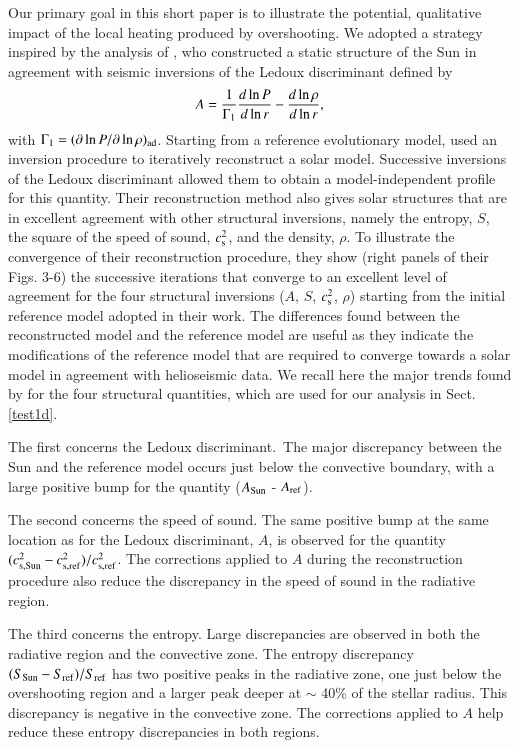 \documentclass[traditabstract]{aa}
\newcommand{\3}{\ss}
\newcommand{\ct}{\citet}
\begin{document}
{Our primary goal in this short paper is to illustrate the potential, qualitative impact of the local heating produced by overshooting.
We adopted a
strategy inspired by the analysis of \ct{buldgen20},  who constructed a static structure of the Sun in agreement with seismic inversions of the Ledoux discriminant defined by
\begin{equation}
A = {1 \over \Gamma_1} {d \ln P \over d \ln r} - {d \ln \rho \over d \ln r },
\end{equation}
with $\Gamma_1 = (\partial \ln P / \partial \ln \rho)_{\rm ad}$.
Starting from a reference evolutionary model, \ct{buldgen20} used an inversion procedure to iteratively reconstruct a solar model. Successive inversions of the Ledoux discriminant allowed them to obtain a model-independent profile for this quantity. Their reconstruction method also gives solar structures that are in excellent agreement with other  structural inversions, namely the entropy, $S$, the square of the speed of sound, $c_{\rm s}^2$, and the density, $\rho$.
 To illustrate the convergence of their reconstruction procedure, they show (right panels of their Figs. 3-6) the successive iterations that converge to an excellent level of agreement for the four structural inversions ($A$, $S$, $c_{\rm s}^2$, $\rho$) starting from the initial reference model adopted in their work. The differences found between the reconstructed model and the reference model  are useful as they indicate the modifications of the reference model that are required to converge towards a solar model in agreement with  helioseismic data.  We recall here the major trends  found by \ct{buldgen20} for the four structural quantities, which are used for our analysis in Sect. \ref{test1d}.

The first concerns the Ledoux discriminant.\ The major discrepancy between the  Sun and the reference model occurs just below the convective boundary, with a large positive bump for the quantity ($A_{\rm Sun}$ - $A_{\rm ref}$). 

The second concerns the speed of sound. The same positive bump at the same location as for the Ledoux discriminant, $A$, is observed for the quantity $(c^2_{\rm s,Sun} - c^2_{\rm s,ref})/c^2_{\rm s,ref}$. The corrections applied to $A$ during the reconstruction procedure also reduce the discrepancy in the speed of sound in the radiative region.

The third concerns the entropy. Large discrepancies are observed in both the radiative region and the convective zone. The entropy discrepancy $(S_{\rm Sun}- S_{\rm ref})/S_{\rm ref}$ has two positive peaks in the radiative zone, one just below the overshooting region and a larger peak deeper at $\sim$ 40\% of the stellar radius. This discrepancy is  negative in the convective zone. The corrections applied to $A$ help reduce these entropy discrepancies in both regions.

}
\end{document}
